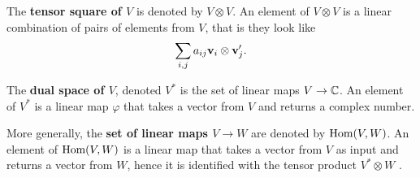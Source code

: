 \begin{example}
	The \textbf{tensor square of $V$} is denoted by $V \otimes V$. An element of $V \otimes V$ is a linear combination of pairs of elements from $V$, that is they look like
	\begin{align*}
		\sum_{i,j} a_{ij} \mathbf{v}_i \otimes \mathbf{v}'_j.
	\end{align*}
%	
%	
\end{example}

The \textbf{dual space of $V$}, denoted $V^*$ is the set of linear maps $V \rightarrow \mathbb{C}$. An element of $V^*$ is a linear map $\varphi$ that takes a vector from $V$ and returns a complex number.

More generally, the \textbf{set of linear maps $V \rightarrow W$} are denoted by $\text{Hom}(V,W)$. An element of $\text{Hom}(V,W)$ is a linear map that takes a vector from $V$ as input and returns a vector from $W$, hence it is identified with the tensor product $V^* \otimes W$ \cite[Sect.1.1.]{FultonHarris}.

